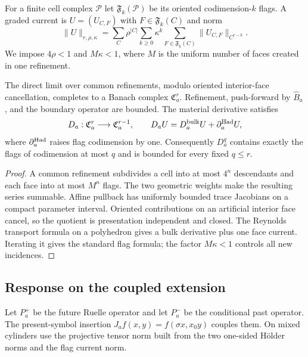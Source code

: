 For a finite cell complex $\mathscr P$ let $\mathfrak F_k(\mathscr P)$ be its
oriented codimension-$k$ flags.  A graded current is
$U=(U_{C,F})$ with $F\in\mathfrak F_k(C)$ and norm
\[
 \|U\|_{r,\rho,\kappa}
 =\sum_{C}\rho^{|C|}\sum_{k\ge0}\kappa^k
   \sum_{F\in\mathfrak F_k(C)}\|U_{C,F}\|_{C^{r-k}}.
\]
We impose $4\rho<1$ and $M\kappa<1$, where $M$ is the uniform number of faces
created in one refinement.

\begin{theorem}
\label{thm:r12-a1-currents}
The direct limit over common refinements, modulo oriented interior-face
cancellation, completes to a Banach complex $\mathfrak C_a^r$.  Refinement,
push-forward by $\widehat B_a$, and the boundary operator are bounded.  The
material derivative satisfies
\[
 D_a:\mathfrak C_a^r\longrightarrow\mathfrak C_a^{r-1},
 \qquad D_aU=D_a^{\rm bulk}U+\partial_a^{\rm Had}U,
\]
where $\partial_a^{\rm Had}$ raises flag codimension by one.  Consequently
$D_a^q$ contains exactly the flags of codimension at most $q$ and is bounded
for every fixed $q\le r$.
\end{theorem}

\begin{proof}
A common refinement subdivides a cell into at most $4^n$ descendants and each
face into at most $M^n$ flags.  The two geometric weights make the resulting
series summable.  Affine pullback has uniformly bounded trace Jacobians on a
compact parameter interval.  Oriented contributions on an artificial
interior face cancel, so the quotient is presentation independent and closed.
The Reynolds transport formula on a polyhedron gives a bulk derivative plus
one face current.  Iterating it gives the standard flag formula; the factor
$M\kappa<1$ controls all new incidences.
\end{proof}

\subsection{Response on the coupled extension}

Let $P_a^+$ be the future Ruelle operator and let $P_a^-$ be the conditional
past operator.  The present-symbol insertion
$J_af(x,y)=f(\sigma x,x_0y)$ couples them.  On mixed cylinders use the
projective tensor norm built from the two one-sided Hölder norms and the flag
current norm.

